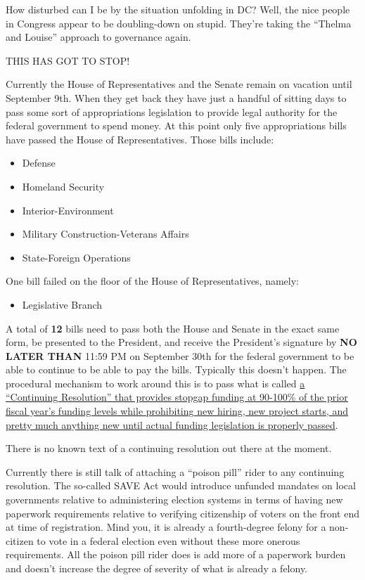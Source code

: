 How disturbed can I be by the situation unfolding in DC? Well, the nice
people in Congress appear to be doubling-down on stupid. They're taking
the ``Thelma and Louise'' approach to governance again.

THIS HAS GOT TO STOP!

Currently the House of Representatives and the Senate remain on vacation
until September 9th. When they get back they have just a handful of
sitting days to pass some sort of appropriations legislation to provide
legal authority for the federal government to spend money. At this point
only five appropriations bills have passed the House of Representatives.
Those bills include:

\begin{itemize}
\item
  Defense
\item
  Homeland Security
\item
  Interior-Environment
\item
  Military Construction-Veterans Affairs
\item
  State-Foreign Operations
\end{itemize}

One bill failed on the floor of the House of Representatives, namely:

\begin{itemize}
\item
  Legislative Branch
\end{itemize}

A total of \textbf{12} bills need to pass both the House and Senate in
the exact same form, be presented to the President, and receive the
President's signature by \textbf{NO LATER THAN} 11:59 PM on September
30th for the federal government to be able to continue to be able to pay
the bills. Typically this doesn't happen. The procedural mechanism to
work around this is to pass what is called
\href{https://web.archive.org/web/20240816195931/https://bipartisanpolicy.org/explainer/what-to-know-about-continuing-resolutions/}{a
``Continuing Resolution'' that provides stopgap funding at 90-100\% of
the prior fiscal year's funding levels while prohibiting new hiring, new
project starts, and pretty much anything new until actual funding
legislation is properly passed}.

There is no known text of a continuing resolution out there at the
moment.

Currently there is still talk of attaching a ``poison pill'' rider to
any continuing resolution. The so-called SAVE Act would introduce
unfunded mandates on local governments relative to administering
election systems in terms of having new paperwork requirements relative
to verifying citizenship of voters on the front end at time of
registration. Mind you, it is already a fourth-degree felony for a
non-citizen to vote in a federal election even without these more
onerous requirements. All the poison pill rider does is add more of a
paperwork burden and doesn't increase the degree of severity of what is
already a felony.

